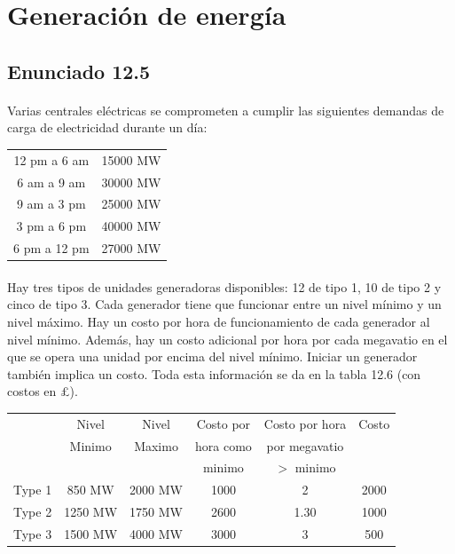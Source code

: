 \section{Generación de energía}
\subsection{Enunciado 12.5}
\paragraph{} Varias centrales eléctricas se comprometen a cumplir las siguientes demandas de carga de electricidad durante un día:\\
\begin{center}
\begin{tabular}{cc}
\hline 
12 pm a 6 am & 15000 MW \\  
6 am a 9 am & 30000 MW \\  
9 am a 3 pm & 25000 MW \\  
3 pm a 6 pm & 40000 MW \\  
6 pm a 12 pm & 27000 MW \\ 
\hline 
\end{tabular} 
\end{center}

\paragraph{} Hay tres tipos de unidades generadoras disponibles: 12 de tipo 1, 10 de tipo 2 y cinco de tipo 3. Cada generador tiene que funcionar entre un nivel mínimo y un nivel máximo. Hay un costo por hora de funcionamiento de cada generador al nivel mínimo. Además, hay un costo adicional por hora por cada megavatio en el que se opera una unidad por encima del nivel mínimo. Iniciar un generador también implica un costo. Toda esta información se da en la tabla 12.6 (con costos en \pounds).
\begin{center}
\begin{tabular}{cccccc}
\hline 
 & Nivel & Nivel & Costo por  & Costo por hora & Costo \\ 
 & Minimo & Maximo & hora como & por megavatio &  \\ 
 &  &  & minimo & $>$ minimo &  \\ 
\hline 
Type 1 & 850 MW & 2000 MW & 1000 & 2 & 2000 \\ 
Type 2 & 1250 MW & 1750 MW & 2600 & 1.30 & 1000 \\ 
Type 3 & 1500 MW & 4000 MW & 3000 & 3 & 500 \\ 
\hline 
\end{tabular} 
\end{center}

